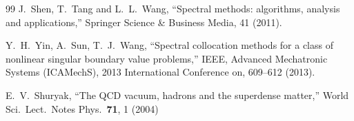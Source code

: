 \documentclass[11pt,a4paper,psfrag]{article}
\begin{document}
\begin{thebibliography}{99}
  J.~Shen, T.~Tang and L.~L.~Wang,
  ``Spectral methods: algorithms, analysis and applications,''
  Springer Science \& Business Media, 41 (2011).

  Y.~H.~Yin, A.~Sun, T.~J.~Wang,
  ``Spectral collocation methods for a class of nonlinear singular boundary value problems,''
  IEEE, Advanced Mechatronic Systems (ICAMechS), 2013 International Conference on, 609--612 (2013).

  E.~V.~Shuryak,
  ``The QCD vacuum, hadrons and the superdense matter,''
  World Sci.\ Lect.\ Notes Phys.\  {\bf 71}, 1 (2004)






\end{thebibliography}
\end{document}
